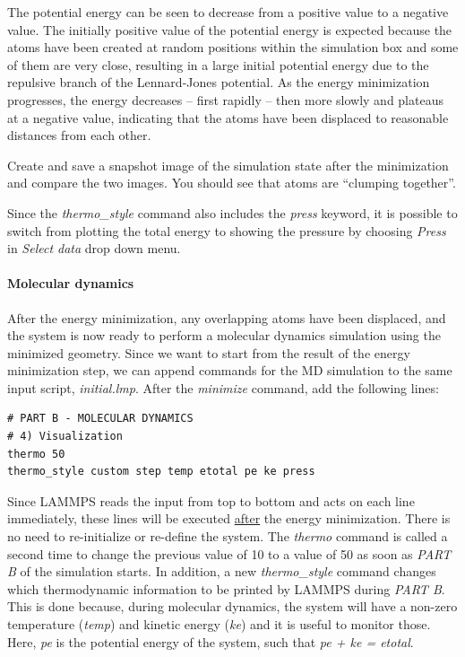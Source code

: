 \documentclass[9pt,tutorial]{livecoms}
\renewcommand{\emph}[1]{\underline{#1}}
\begin{document}
The potential energy can be seen to decrease from a positive value to a
negative value.  The initially positive value of the potential energy is
expected because the atoms have been created at random positions within
the simulation box and some of them are very close, resulting in a large
initial potential energy due to the repulsive branch of the
Lennard-Jones potential.  As the energy minimization progresses, the
energy decreases -- first rapidly -- then more slowly and plateaus at
a negative value, indicating that the atoms have been displaced to
reasonable distances from each other.

Create and save a snapshot image of the simulation state after the
minimization and compare the two images.  You should see that atoms
are ``clumping together''.

Since the \textit{thermo\_style} command also includes the \textit{press}
keyword, it is possible to switch from plotting the total energy to
showing the pressure by choosing \textit{Press} in \textit{Select data}
drop down menu.

\paragraph{Molecular dynamics}

After the energy minimization, any overlapping atoms have been displaced,
and the system is now ready to perform a molecular dynamics simulation
using the minimized geometry.  Since we want to start from the result of
the energy minimization step, we can append commands for the MD simulation
to the same input script, \textit{initial.lmp}. After the
\textit{minimize} command, add the following lines:
\begin{lstlisting}
# PART B - MOLECULAR DYNAMICS
# 4) Visualization
thermo 50
thermo_style custom step temp etotal pe ke press
\end{lstlisting}

Since LAMMPS reads the input from top to bottom and acts on each line
immediately, these lines will be executed \emph{after} the energy
minimization.  There is no need to re-initialize or re-define the
system.  The \textit{thermo} command is called a second time to change
the previous value of 10 to a value of 50 as soon as \textit{PART B} of
the simulation starts.  In addition, a new \textit{thermo\_style}
command changes which thermodynamic information to be printed by LAMMPS
during \textit{PART B}.  This is done because, during molecular
dynamics, the system will have a non-zero temperature (\textit{temp})
and kinetic energy (\textit{ke}) and it is useful to monitor those.
Here, \textit{pe} is the potential energy of the system, such that
\textit{pe + ke = etotal}.
\end{document}
